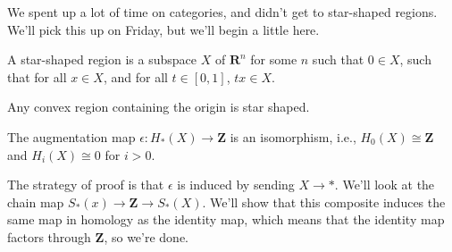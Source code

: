 We spent up a lot of time on categories, and didn't get to star-shaped regions. We'll pick this up on Friday, but we'll begin a little here.
\begin{definition}
A star-shaped region is a subspace $X$ of $\mathbf{R}^n$ for some $n$ such that $0\in X$, such that for all $x\in X$, and for all $t\in[0,1]$, $tx\in X$. 
\end{definition}
\begin{example}
Any convex region containing the origin is star shaped.
\end{example}
\begin{theorem}
The augmentation map $\epsilon: H_\ast(X)\to \mathbf{Z}$ is an isomorphism, i.e., $ H_0(X)\cong\mathbf{Z}$ and $ H_i(X)\cong 0$ for $i>0$.
\end{theorem}
The strategy of proof is that $\epsilon$ is induced by sending $X\to \ast$. We'll look at the chain map $S_\ast(x)\to\mathbf{Z}\to S_\ast(X)$. We'll show that this composite induces the same map in homology as the identity map, which means that the identity map factors through $\mathbf{Z}$, so we're done.
